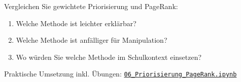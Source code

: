 \begin{mychallenge}
    Vergleichen Sie gewichtete Priorisierung und PageRank:
    \begin{enumerate}
        \item Welche Methode ist leichter erklärbar?
        \item Welche Methode ist anfälliger für Manipulation?
        \item Wo würden Sie welche Methode im Schulkontext einsetzen?
    \end{enumerate}
\end{mychallenge}

\begin{myremark}[Notebook]
    Praktische Umsetzung inkl. Übungen:
    \href{\notebookbaseurl06_Priorisierung_PageRank.ipynb}{\texttt{06\_Priorisierung\_PageRank.ipynb}}
\end{myremark}
